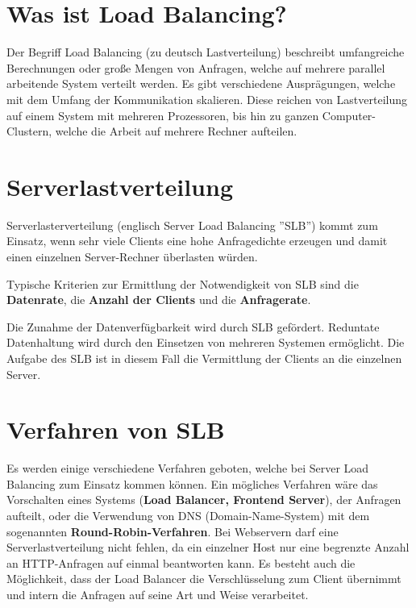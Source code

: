 


\section{Was ist Load Balancing?}\cite{Lastverteilung}
Der Begriff Load Balancing (zu deutsch Lastverteilung) beschreibt umfangreiche Berechnungen oder große Mengen von Anfragen, welche auf mehrere parallel arbeitende System verteilt werden. Es gibt verschiedene Ausprägungen, welche mit dem Umfang der Kommunikation skalieren. Diese reichen von
Lastverteilung auf einem System mit mehreren Prozessoren, bis hin zu ganzen Computer-Clustern, welche die Arbeit auf mehrere Rechner aufteilen.

\section{Serverlastverteilung}

Serverlasterverteilung (englisch Server Load Balancing ''SLB'') kommt zum Einsatz, wenn sehr viele Clients eine hohe Anfragedichte erzeugen und damit einen einzelnen Server-Rechner überlasten würden.\newline

Typische Kriterien zur Ermittlung der Notwendigkeit von SLB sind die \textbf{Datenrate}, die \textbf{Anzahl der Clients} und die \textbf{Anfragerate}. \newline

Die Zunahme der Datenverfügbarkeit wird durch SLB gefördert. Reduntate Datenhaltung wird durch den Einsetzen von mehreren Systemen ermöglicht. Die Aufgabe des SLB ist in diesem Fall die Vermittlung der Clients an die einzelnen Server. \newline

\section{Verfahren von SLB}
Es werden einige verschiedene Verfahren geboten, welche bei Server Load Balancing zum Einsatz kommen können. Ein mögliches Verfahren wäre das Vorschalten eines Systems (\textbf{Load Balancer, Frontend Server}), der Anfragen aufteilt, oder die Verwendung von DNS (Domain-Name-System) mit dem sogenannten \textbf{Round-Robin-Verfahren}. Bei Webservern darf eine Serverlastverteilung nicht fehlen, da ein einzelner Host nur eine begrenzte Anzahl an HTTP-Anfragen auf einmal beantworten kann. Es besteht auch die Möglichkeit, dass der Load Balancer die Verschlüsselung zum Client übernimmt und intern die Anfragen auf seine Art und Weise verarbeitet. \newline


